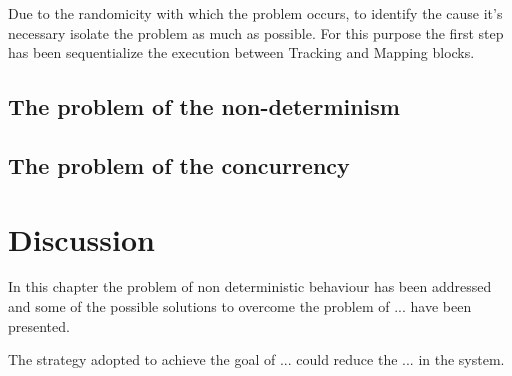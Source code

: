 Due to the randomicity with which the problem occurs, to identify the cause it's necessary isolate the problem as much as possible. For this purpose the first step has been sequentialize the execution between Tracking and Mapping blocks.








\subsection{The problem of the non-determinism} %


\subsection{The problem of the concurrency} %




\section{Discussion}
In this chapter the problem of non deterministic behaviour has been addressed and some of the possible solutions to overcome the problem of ...  have been presented.

The strategy adopted to achieve the goal of ... could reduce the ... in the system.


\clearpage
\thispagestyle{empty}